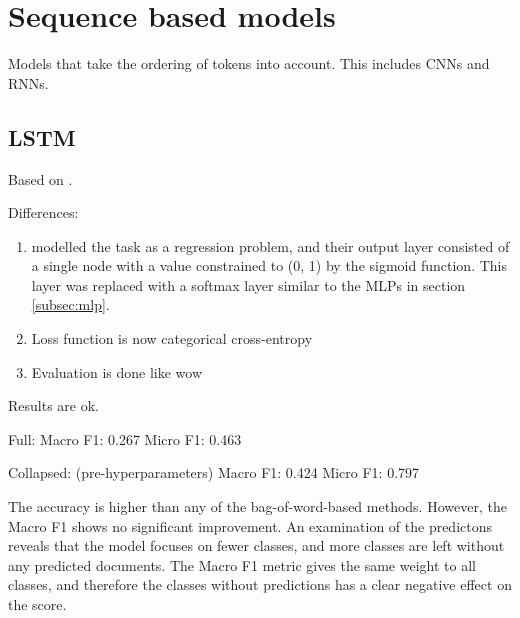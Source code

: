 \section{Sequence based models}

Models that take the ordering of tokens into account.
This includes \acp{CNN} and \acp{RNN}.

\subsection{LSTM}

Based on \textcite{taghipour16}.

Differences:

\begin{enumerate}
    \item \citeauthor{taghipour16} modelled the task as a regression problem,
        and their output layer consisted of a single node with a value constrained
        to (0, 1) by the sigmoid function. This layer was replaced with a softmax
        layer similar to the \acp{MLP} in section \ref{subsec:mlp}.
    \item Loss function is now categorical cross-entropy
    \item Evaluation is done like wow
\end{enumerate}

Results are ok.

Full:
Macro F1: 0.267
Micro F1: 0.463

Collapsed: (pre-hyperparameters)
Macro F1: 0.424
Micro F1: 0.797

The accuracy is higher than any of the bag-of-word-based methods. However, the
Macro F1 shows no significant improvement. An examination of the predictons
reveals that the model focuses on fewer classes, and more classes are left
without any predicted documents. The Macro F1 metric gives the same weight to
all classes, and therefore the classes without predictions has a clear
negative effect on the score.


